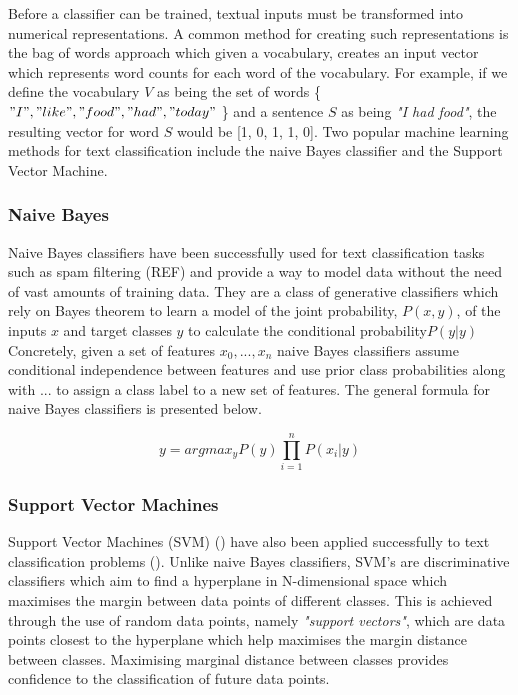 \noindent
\newline
Before a classifier can be trained, textual inputs must be transformed into numerical representations. A common method for creating such representations is the bag of words approach which given a vocabulary, creates an input vector which represents word counts for each word of the vocabulary. For example, if we define the vocabulary \(V\) as being the set of words \{\("I", "like", "food", "had", "today"\) \} and a sentence \(S\) as being \textit{"I had food"}, the resulting vector for word \(S\) would be [1, 0, 1, 1, 0]. Two popular machine learning methods for text classification include the naive Bayes classifier and the Support Vector Machine.

\subsubsection{Naive Bayes}
\noindent
\newline
Naive Bayes classifiers have been successfully used for text classification tasks such as spam filtering (REF) and provide a way to model data without the need of vast amounts of training data. They are a class of generative classifiers which rely on Bayes theorem to learn a model of the joint probability, \(P(x, y)\), of the inputs \(x\) and target classes \(y\) to calculate the conditional probability\(P(y|y)\) Concretely, given a set of features \(x_{0},...,x_{n}\) naive Bayes classifiers assume conditional independence between features and use prior class probabilities along with ... to assign a class label to a new set of features. The general formula for naive Bayes classifiers is presented below.

\begin{equation}
y = argmax_{y} P(y) \prod_{i=1}^{n}P(x_{i} | y)
\end{equation}

\subsubsection{Support Vector Machines}
\noindent
\newline 
Support Vector Machines (SVM) (\cite{Cortes1995}) have also been applied successfully to text classification problems (\cite{Joachims1998}). Unlike naive Bayes classifiers, SVM's are discriminative classifiers which aim to find a hyperplane in N-dimensional space which maximises the margin between data points of different classes. This is achieved through the use of random data points, namely \textit{"support vectors"}, which are data points closest to the hyperplane which help maximises the margin distance between classes. Maximising marginal distance between classes provides confidence to the classification of future data points.

